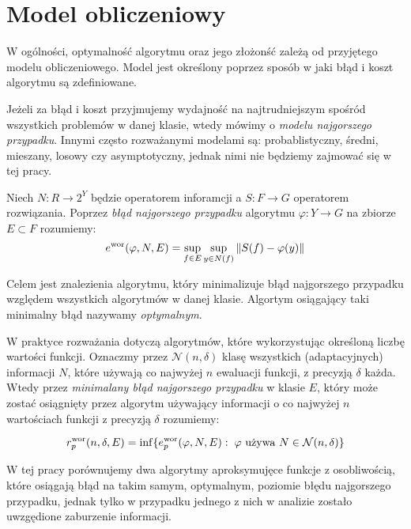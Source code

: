 \documentclass[oik, pdftex, robocza, man]{mgrwms}
\begin{document}
\section{Model obliczeniowy}


    W ogólności, optymalność algorytmu oraz jego złożonść zależą od przyjętego modelu obliczeniowego. Model jest określony poprzez sposób w jaki błąd i koszt algorytmu są zdefiniowane. 
    
    Jeżeli za błąd i koszt przyjmujemy wydajność na najtrudniejszym spośród wszystkich problemów w danej klasie, wtedy mówimy o \textit{modelu najgorszego przypadku}. Innymi często rozważanymi modelami są: probablistyczny, średni, mieszany, losowy czy asymptotyczny, jednak nimi nie będziemy zajmować się w tej pracy.

    Niech $N : R \rightarrow 2^{Y}$ będzie operatorem inforamcji a $S: F \rightarrow G$ operatorem rozwiązania. Poprzez \textit{błąd najgorszego przypadku} algorytmu $\varphi : Y \rightarrow G$ na zbiorze $E \subset F$ rozumiemy:
    \begin{equation*}
        e^{\mathrm{wor}}(\varphi, N, E) = \sup_{f \in E} \sup_{y \in N(f)} \|S(f) - \varphi(y) \|
    \end{equation*}

    Celem jest znalezienia algorytmu, który minimalizuje błąd najgorszego przypadku względem wszystkich algorytmów w danej klasie. Algortym osiągający taki minimalny błąd nazywamy \textit{optymalnym}.

    W praktyce rozważania dotyczą algorytmów, które wykorzystując określoną liczbę wartości funkcji. Oznaczmy przez $\mathcal{N}(n, \delta)$ klasę wszystkich (adaptacyjnych) informacji $N$, które używają co najwyżej $n$ ewaluacji funkcji, z precyzją $\delta$ każda. Wtedy przez \textit{minimalany błąd najgorszego przypadku} w klasie $E$, który może zostać osiągnięty przez algorytm używający informacji o co najwyżej $n$ wartościach funkcji z precyzją $\delta$ rozumiemy:

    \begin{equation*}
        r^{\mathrm{wor}}_{p}(n, \delta, E) = \inf\{ e^{\mathrm{wor}}_{p}(\varphi, N, E) : \; \varphi \text{ używa } N \in \mathcal{N}(n, \delta) \}
    \end{equation*}


    W tej pracy porównujemy dwa algorytmy aproksymujęce funkcje z osobliwością, które osiągają błąd na takim samym, optymalnym, poziomie błędu najgorszego przypadku, jednak tylko w przypadku jednego z nich w analizie zostało uwzgędione zaburzenie informacji.
\end{document}
